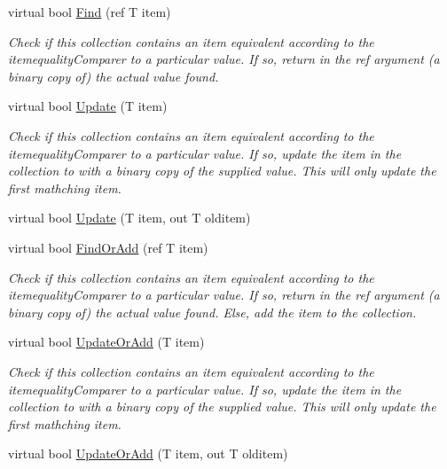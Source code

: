 \begin{DoxyCompactItemize}
virtual bool \hyperlink{class_c5_1_1_hashed_array_list_ac29e24d17686e2c3998a590a60b27d71}{Find} (ref T item)
\begin{DoxyCompactList}\small\item\em Check if this collection contains an item equivalent according to the itemequality\+Comparer to a particular value. If so, return in the ref argument (a binary copy of) the actual value found. \end{DoxyCompactList}\item 
virtual bool \hyperlink{class_c5_1_1_hashed_array_list_a265287f01f52f2975ffdc926af3e8998}{Update} (T item)
\begin{DoxyCompactList}\small\item\em Check if this collection contains an item equivalent according to the itemequality\+Comparer to a particular value. If so, update the item in the collection to with a binary copy of the supplied value. This will only update the first mathching item. \end{DoxyCompactList}\item 
virtual bool \hyperlink{class_c5_1_1_hashed_array_list_a68f51b76c891c44cd424c7604cef85ab}{Update} (T item, out T olditem)
\item 
virtual bool \hyperlink{class_c5_1_1_hashed_array_list_a7adaad90a9e57a90c3bc197dc4d1289c}{Find\+Or\+Add} (ref T item)
\begin{DoxyCompactList}\small\item\em Check if this collection contains an item equivalent according to the itemequality\+Comparer to a particular value. If so, return in the ref argument (a binary copy of) the actual value found. Else, add the item to the collection. \end{DoxyCompactList}\item 
virtual bool \hyperlink{class_c5_1_1_hashed_array_list_a97e9d72944cb3ff6b5d5162e381e36e7}{Update\+Or\+Add} (T item)
\begin{DoxyCompactList}\small\item\em Check if this collection contains an item equivalent according to the itemequality\+Comparer to a particular value. If so, update the item in the collection to with a binary copy of the supplied value. This will only update the first mathching item. \end{DoxyCompactList}\item 
virtual bool \hyperlink{class_c5_1_1_hashed_array_list_ac0be87fa58015a3191d91ab0e8c75766}{Update\+Or\+Add} (T item, out T olditem)
\item 

\end{DoxyCompactItemize}
